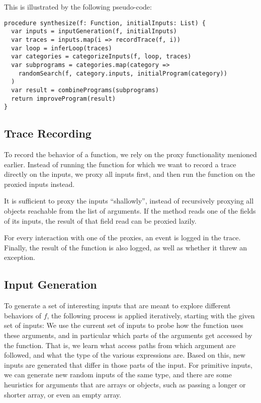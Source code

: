 \documentclass[]{article}
\begin{document}
This is illustrated by the following pseudo-code:
\begin{verbatim}
procedure synthesize(f: Function, initialInputs: List) {
  var inputs = inputGeneration(f, initialInputs)
  var traces = inputs.map(i => recordTrace(f, i))
  var loop = inferLoop(traces)
  var categories = categorizeInputs(f, loop, traces)
  var subprograms = categories.map(category =>
    randomSearch(f, category.inputs, initialProgram(category))
  )
  var result = combinePrograms(subprograms)
  return improveProgram(result)
}
\end{verbatim}



\subsection{Trace Recording}

To record the behavior of a function, we rely on the proxy functionality
menioned earlier.  Instead of running the function for which we want to record
a trace directly on the inputs, we proxy all inputs first, and then run
the function on the proxied inputs instead.

It is sufficient to proxy the inputs ``shallowly'', instead of recursively
proxying all objects reachable from the list of arguments.  If the method
reads one of the fields of its inputs, the result of that field read can
be proxied lazily.

For every interaction with one of the proxies, an event is logged in the trace.
Finally, the result of the function is also logged, as well as whether it
threw an exception.


\subsection{Input Generation}

To generate a set of interesting inputs that are meant to explore different
behaviors of $f$, the following process is applied iteratively, starting with
the given set of inputs:
We use the current set of inputs to probe how the function uses these arguments,
and in particular which parts of the arguments get accessed by the function.
That is, we learn what access paths from which argument are followed, and
what the type of the various expressions are.
Based on this, new inputs are generated that differ in those parts of the
input.  For primitive inputs, we can generate new random inputs of the same
type, and there are some heuristics for arguments that are arrays or objects,
such as passing a longer or shorter array, or even an empty array.
\end{document}
